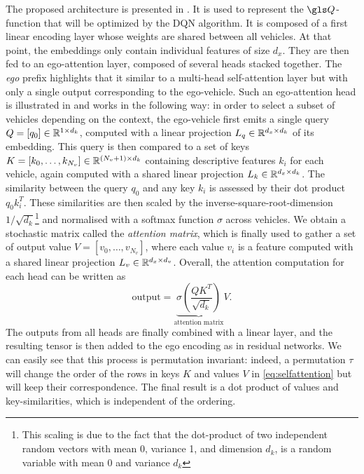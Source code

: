 The proposed architecture is presented in . It is used to represent the $\Q$-function that will be optimized by the \gls{DQN} algorithm. It is composed of a first linear encoding layer whose weights are shared between all vehicles. At that point, the embeddings only contain individual features of size $d_x$. They are then fed to an ego-attention layer, composed of several heads stacked together. The \emph{ego} prefix highlights that it similar to a multi-head self-attention layer \citep{Vaswani2017} but with only a single output corresponding to the ego-vehicle. Such an ego-attention head is illustrated in  and works in the following way: in order to select a subset of vehicles depending on the context, the ego-vehicle  first emits a single query $Q = [q_0]\in\mathbb{R}^{1 \times d_k}$, computed with a linear projection $L_q\in\mathbb{R}^{d_x \times d_k}$ of its embedding. This query is then compared to a set of keys $K = [k_0, \dots, k_{N_v}]\in\mathbb{R}^{(N_v+1) \times d_k}$ containing descriptive features $k_i$ for each vehicle, again computed with a shared linear projection $L_k\in\mathbb{R}^{d_x \times d_k}$. The similarity between the query $q_0$ and any key $k_i$ is assessed by their dot product $q_0 k_i^T$. These similarities are then scaled by the inverse-square-root-dimension $1/\sqrt{d_k}$\footnote{This scaling is due to the fact that the dot-product of two independent random vectors with mean 0,  variance 1, and dimension $d_k$, is a random variable with mean 0 and variance $d_k$} and normalised with a softmax function $\sigma$ across vehicles. We obtain a stochastic matrix called the \emph{attention matrix}, which is finally used to gather a set of output value $V = [v_0, \dots, v_{N_v}]$, where each value $v_i$ is a feature computed with a shared linear projection $L_v\in\mathbb{R}^{d_x \times d_v}$. Overall, the attention computation for each head can be written as
\begin{equation}
\text{output}=\underbrace{\sigma\left(\frac{QK^T}{\sqrt{d_k}}\right)}_{\text{attention matrix}}V.
\label{eq:selfattention}
\end{equation}
The outputs from all heads are finally combined with a linear layer, and the resulting tensor is then added to the ego encoding as in residual networks. We can easily see that this process is permutation invariant: indeed, a permutation $\tau$ will change the order of the rows in keys $K$ and values $V$ in \eqref{eq:selfattention} but will keep their correspondence. The final result is a dot product of values and key-similarities, which is independent of the ordering.


